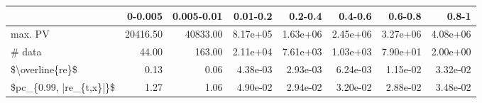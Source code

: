 \begin{tabular}{lrrrrrrr}
\toprule
{} &   0-0.005 &  0.005-0.01 &  0.01-0.2 &   0.2-0.4 &   0.4-0.6 &   0.6-0.8 &     0.8-1 \\
\midrule
max. PV                 &  20416.50 &    40833.00 &  8.17e+05 &  1.63e+06 &  2.45e+06 &  3.27e+06 &  4.08e+06 \\
\# data                  &     44.00 &      163.00 &  2.11e+04 &  7.61e+03 &  1.03e+03 &  7.90e+01 &  2.00e+00 \\
\$\textbackslash overline\{re\}\$         &      0.13 &        0.06 &  4.38e-03 &  2.93e-03 &  6.24e-03 &  1.15e-02 &  3.32e-02 \\
\$pc\_\{0.99, |re\_\{t,x\}|\}\$ &      1.27 &        1.06 &  4.90e-02 &  2.94e-02 &  3.20e-02 &  2.88e-02 &  3.48e-02 \\
\bottomrule
\end{tabular}
